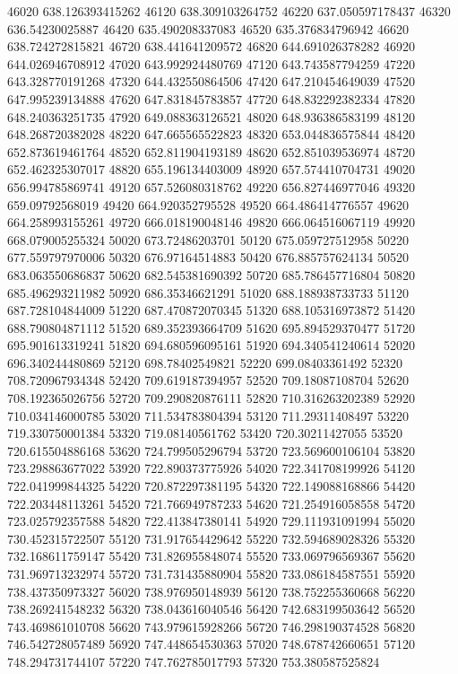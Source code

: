 {46020 638.126393415262
46120 638.309103264752
46220 637.050597178437
46320 636.54230025887
46420 635.490208337083
46520 635.376834796942
46620 638.724272815821
46720 638.441641209572
46820 644.691026378282
46920 644.026946708912
47020 643.992924480769
47120 643.743587794259
47220 643.328770191268
47320 644.432550864506
47420 647.210454649039
47520 647.995239134888
47620 647.831845783857
47720 648.832292382334
47820 648.240363251735
47920 649.088363126521
48020 648.936386583199
48120 648.268720382028
48220 647.665565522823
48320 653.044836575844
48420 652.873619461764
48520 652.811904193189
48620 652.851039536974
48720 652.462325307017
48820 655.196134403009
48920 657.574410704731
49020 656.994785869741
49120 657.526080318762
49220 656.827446977046
49320 659.09792568019
49420 664.920352795528
49520 664.486414776557
49620 664.258993155261
49720 666.018190048146
49820 666.064516067119
49920 668.079005255324
50020 673.72486203701
50120 675.059727512958
50220 677.559797970006
50320 676.97164514883
50420 676.885757624134
50520 683.063550686837
50620 682.545381690392
50720 685.786457716804
50820 685.496293211982
50920 686.35346621291
51020 688.188938733733
51120 687.728104844009
51220 687.470872070345
51320 688.105316973872
51420 688.790804871112
51520 689.352393664709
51620 695.894529370477
51720 695.901613319241
51820 694.680596095161
51920 694.340541240614
52020 696.340244480869
52120 698.78402549821
52220 699.08403361492
52320 708.720967934348
52420 709.619187394957
52520 709.18087108704
52620 708.192365026756
52720 709.290820876111
52820 710.316263202389
52920 710.034146000785
53020 711.534783804394
53120 711.29311408497
53220 719.330750001384
53320 719.08140561762
53420 720.30211427055
53520 720.615504886168
53620 724.799505296794
53720 723.569600106104
53820 723.298863677022
53920 722.890373775926
54020 722.341708199926
54120 722.041999844325
54220 720.872297381195
54320 722.149088168866
54420 722.203448113261
54520 721.766949787233
54620 721.254916058558
54720 723.025792357588
54820 722.413847380141
54920 729.111931091994
55020 730.452315722507
55120 731.917654429642
55220 732.594689028326
55320 732.168611759147
55420 731.826955848074
55520 733.069796569367
55620 731.969713232974
55720 731.731435880904
55820 733.086184587551
55920 738.437350973327
56020 738.976950148939
56120 738.752255360668
56220 738.269241548232
56320 738.043616040546
56420 742.683199503642
56520 743.469861010708
56620 743.979615928266
56720 746.298190374528
56820 746.542728057489
56920 747.448654530363
57020 748.678742660651
57120 748.294731744107
57220 747.762785017793
57320 753.380587525824
}
